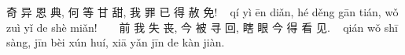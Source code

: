 奇 异 恩 典, 何 等 甘 甜,
我 罪 已 得 赦 免!  
qí yì ēn diǎn, hé děng gān tián,
wǒ zuì yǐ de shè miǎn!  
 
前 我 失 丧, 今 被 寻 回,
瞎 眼 今 得 看 见.  
qián wǒ shī sàng, jīn bèi xún huí,
xiā yǎn jīn de kàn jiàn.
